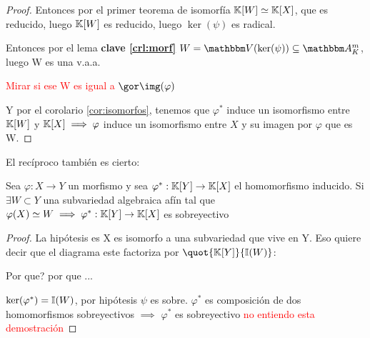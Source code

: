 \begin{proof}

Entonces por el primer teorema de isomorfía
$\mathbb{K}[W] \simeq \mathbb{K}[X]$, que es reducido, luego $\mathbb{K}[W]$ es reducido, luego $\ker(\psi)$ es radical.

Entonces por el lema \textbf{clave \ref{crl:morf}} $W=\V(\ker(\psi)) \subseteq \A_K^m$, luego W es una v.a.a.

\textcolor{red}{Mirar si ese W es igual a $\cls{\img(\varphi)}$}

Y por el corolario \ref{cor:isomorfos}, tenemos que $\varphi^*$ induce un isomorfismo entre $\mathbb{K}[W]$ y $\mathbb{K}[X] \implies \varphi$ induce un isomorfismo entre $X$ y su imagen por $\varphi$ que es W.

\end{proof}

El recíproco también es cierto:


\begin{lemma}
	Sea $\varphi: X \rightarrow Y$ un morfismo y sea $\varphi^*: \mathbb{K}[Y]\rightarrow \mathbb{K}[X]$ el homomorfismo inducido. Si $\exists W \subset Y$ una subvariedad algebraica afín tal que $\varphi(X) \simeq W \implies \varphi^*:\mathbb{K}[Y] \rightarrow \mathbb{K}[X]$ es sobreyectivo
\end{lemma}

\begin{proof}
	La hipótesis es X es isomorfo a una subvariedad que vive en Y. Eso quiere decir que el diagrama este factoriza por $\quot{\K[Y]}{\I(W)}$:


	Por que? por que ...

	$\ker(\varphi^*)=\mathbb{I}(W)$, por hipótesis $\psi$ es sobre. $\varphi^*$ es composición de dos homomorfismos sobreyectivos $\implies$ $\varphi^*$ es sobreyectivo \textcolor{red}{no entiendo esta demostración}

\end{proof}

